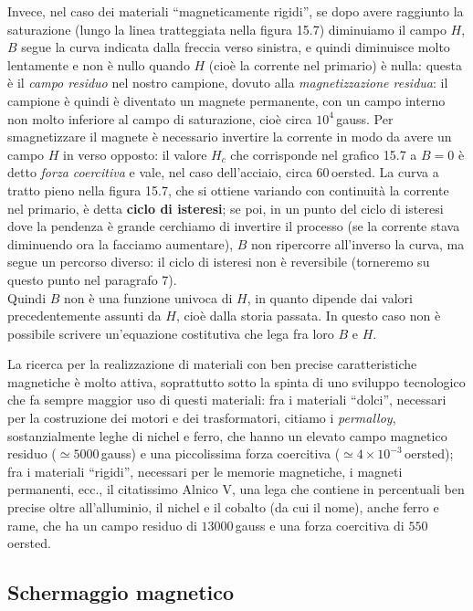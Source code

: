 Invece, nel caso dei materiali ``magneticamente rigidi'', se dopo avere
raggiunto la saturazione (lungo la linea tratteggiata nella figura 15.7)
diminuiamo il campo $H$, $B$ segue la curva indicata dalla freccia verso
sinistra, e quindi diminuisce molto lentamente e non \`e nullo quando $H$
(cio\`e la corrente nel primario) \`e nulla: questa \`e il \textit{campo
residuo} nel nostro campione, dovuto alla \textit{magnetizzazione residua}: il
campione \`e quindi \`e diventato un magnete permanente, con un campo interno
non molto inferiore al campo di saturazione, cio\`e circa $10^4\,$gauss. Per
smagnetizzare il magnete \`e necessario invertire la corrente in modo da avere
un campo $H$ in verso opposto: il valore $H_c$ che corrisponde nel grafico 15.7
a $B=0$ \`e detto \textit{forza coercitiva} e vale, nel caso dell'acciaio, circa
$60\,$oersted.
La curva a tratto pieno nella figura 15.7, che si ottiene variando con
continuit\`a la corrente nel primario, \`e detta \textbf{ciclo di isteresi}; se
poi, in un punto del ciclo di isteresi dove la pendenza \`e grande cerchiamo di
invertire il processo (se la corrente stava diminuendo ora la facciamo
aumentare), $B$ non ripercorre all'inverso la curva, ma segue un percorso
diverso: il ciclo di isteresi non \`e reversibile (torneremo su questo punto nel
paragrafo 7).\\
Quindi $B$ non \`e una funzione univoca di $H$, in quanto dipende dai valori
precedentemente assunti da $H$, cio\`e dalla storia passata. In questo caso non
\`e possibile scrivere
un'equazione costitutiva che lega fra loro $B$ e $H$.

La ricerca per la realizzazione di materiali con ben precise caratteristiche
magnetiche \`e molto attiva, soprattutto sotto la spinta di uno sviluppo
tecnologico che fa sempre maggior uso di questi materiali: fra i materiali
``dolci'', necessari per la costruzione dei motori e dei trasformatori, citiamo
i \textit{permalloy}, sostanzialmente leghe di nichel e ferro, che hanno un
elevato campo magnetico residuo ($\simeq5000\,$gauss) e una piccolissima forza
coercitiva ($\simeq4\times10^{-3}\,$oersted); fra i materiali ``rigidi'',
necessari per le memorie magnetiche, i magneti permanenti, ecc., il citatissimo
Alnico V, una lega che contiene in percentuali ben precise oltre all'alluminio,
il nichel e il cobalto (da cui il nome), anche ferro e rame, che ha un campo
residuo di $13000\,$gauss e una forza coercitiva di $550\,$oersted.

\subsection{Schermaggio magnetico}

